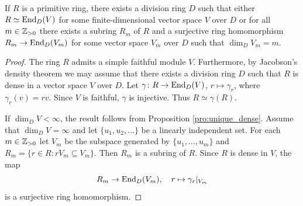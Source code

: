 	


\begin{corollary}
	If $R$ is a primitive ring, there exists a division ring $D$ such that either 
	$R\simeq\operatorname{End}_D(V)$ for some finite-dimensional vector space $V$ over $D$ or 
	for all $m\in\mathbb{Z}_{>0}$ there exists a subring $R_m$ of 
	$R$ and a surjective ring homomorphism $R_m\to\operatorname{End}_D(V_m)$ for some vector space  
	$V_m$ over $D$ such that $\dim_DV_m=m$.
\end{corollary}

\begin{proof}
	The ring $R$ admits a simple faithful module $V$. Furthermore, by Jacobson's density 
	theorem we may assume that there exists a division ring $D$ 
	such that $R$ is dense in a vector space $V$ over $D$. 
	Let $\gamma\colon R\to\operatorname{End}_D(V)$, $r\mapsto\gamma_r$, where 
	$\gamma_r(v)=rv$. Since $V$ is faithful, $\gamma$ is injective. Thus 
	$R\simeq\gamma(R)$. 

	If $\dim_DV<\infty$, the result follows from Proposition \ref{pro:unique_dense}. 
	Assume that $\dim_DV=\infty$ and let $\{u_1,u_2,\dots\}$ be a linearly independent set. 
	For each $m\in\mathbb{Z}_{>0}$ let $V_m$ be the subspace generated by $\{u_1,\dots,u_m\}$
	and $R_m=\{r\in R:rV_m\subseteq V_m\}$. Then $R_m$ is a subring of $R$. 
	Since $R$ is dense in $V$, the map 
	\[
		R_m\to \operatorname{End}_D(V_m),\quad
		r\mapsto\gamma_r|_{V_m}
	\]
	is a surjective ring homomorphism. 
\end{proof}

